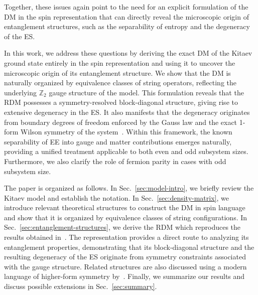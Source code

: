 %
Together, these issues again point to the need for an explicit formulation of the DM in the spin representation that can directly reveal the microscopic origin of entanglement structures, such as the separability of entropy and the degeneracy of the ES.

In this work, we address these questions by deriving the exact DM of the Kitaev ground state entirely in the spin representation and using it to uncover the microscopic origin of its entanglement structure. 
%
We show that the DM is naturally organized by equivalence classes of string operators, reflecting the underlying $\mathbb{Z}_2$ gauge structure of the model. 
%
This formulation reveals that the RDM possesses a symmetry-resolved block-diagonal structure, giving rise to extensive degeneracy in the ES. It also manifests that the degeneracy originates from boundary degrees of freedom enforced by the Gauss law and the exact 1-form Wilson symmetry of the system~\cite{Xu-Rakovszky-Knap-Pollmann_2025}. 
%
Within this framework, the known separability of EE into gauge and matter contributions emerges naturally, providing a unified treatment applicable to both even and odd subsystem sizes. Furthermore, we also clarify the role of fermion parity in cases with odd subsystem size.


The paper is organized as follows.
%
In Sec.~\ref{sec:model-intro}, we briefly review the Kitaev model and establish the notation.
%
In Sec.~\ref{sec:density-matrix}, we introduce relevant theoretical structures to construct the DM in spin language and show that it is organized by equivalence classes of string configurations.
%
In Sec.~\ref{sec:entanglement-structures}, we derive the RDM which reproduces the results obtained in~\cite{Yao-Qi_2010}. The representation provides a direct route to analyzing its entanglement properties, demonstrating that its block-diagonal structure and the resulting degeneracy of the ES originate from symmetry constraints associated with the gauge structure. 
Related structures are also discussed using a modern language of higher-form symmetry by~\cite{Xu-Rakovszky-Knap-Pollmann_2025}.
%
Finally, we summarize our results and discuss possible extensions in Sec.~\ref{sec:summary}.



